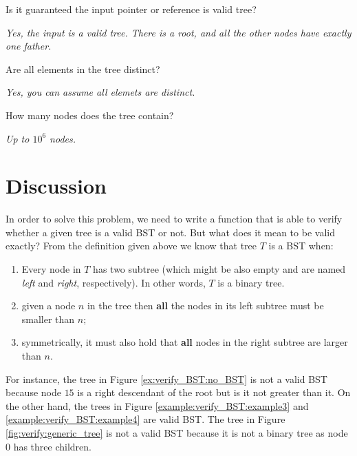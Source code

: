 \begin{QandA}
	\item \begin{questionitem} \begin{question} Is it guaranteed the input pointer or reference is valid tree?  \end{question} 	 
    \begin{answered}
		\textit{Yes, the input is a valid tree. There is a root, and all the other nodes have exactly one father.}
	\end{answered} \end{questionitem}
	\item \begin{questionitem} \begin{question} Are all elements in the tree distinct?  \end{question} 	 
    \begin{answered}
		\textit{Yes, you can assume all elemets are distinct.}
	\end{answered} \end{questionitem}
	\item \begin{questionitem} \begin{question} How many nodes does the tree contain?  \end{question} 	 
    \begin{answered}
		\textit{Up to $10^6$ nodes.}
	\end{answered} \end{questionitem}
\end{QandA}

\section{Discussion}
\label{verify_BST:sec:discussion}
In order to solve this problem, we need to write a function that is able to verify whether a given tree is a valid BST or not. But what does it mean to be valid exactly?
From the definition given above we know that tree $T$ is a BST when:
\begin{enumerate}
	\item Every node in $T$ has two subtree (which might be also empty and are named \textit{left} and \textit{right}, respectively). In other words, $T$ is a binary tree.
	\item given a node $n$ in the tree then \textbf{all} the nodes in its left subtree must be smaller than $n$;
	\item symmetrically, it must also hold that \textbf{all} nodes in the right subtree are larger than $n$.
\end{enumerate}
For instance, the tree in Figure \ref{ex:verify_BST:no_BST} is not a valid BST because node $15$ is a right descendant of the root but is it not greater than it. On the other hand, the trees in Figure \ref{example:verify_BST:example3} and \ref{example:verify_BST:example4} are valid BST. The tree in Figure \ref{fig:verify:generic_tree} is not a valid BST because it is not a binary tree as node $0$ has three children.

